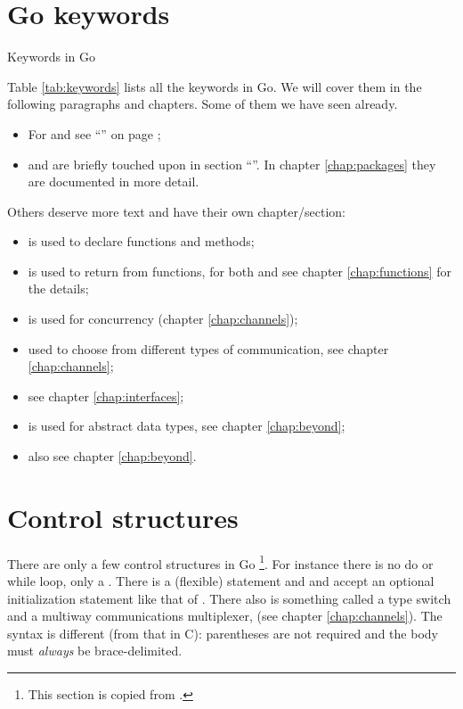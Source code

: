 \section{Go keywords}
\begin{table}[H]
\begin{center}
\caption{Keywords in Go}
\label{tab:keywords}

\end{center}
\end{table}
Table \ref{tab:keywords} lists all the keywords in Go. 
We will cover them in the following paragraphs and chapters. Some
of them we have seen already.
\begin{itemize}
\item For  and  see ``'' on
page \pageref{sec:vars};
\item {} and  are briefly touched upon in section ``''. 
In chapter \ref{chap:packages} they are documented in more detail.
\end{itemize}
Others deserve more text and have their own chapter/section:
\begin{itemize}
\item {} is used to declare functions and methods;
\item {} is used to return from functions, for both 
and  see chapter \ref{chap:functions} for the details;
\item {} is used for concurrency (chapter \ref{chap:channels});
\item {} used to choose from different types of communication, see chapter \ref{chap:channels};
\item {} see chapter \ref{chap:interfaces};
\item {} is used for abstract data types, see chapter \ref{chap:beyond};
\item {} also see chapter \ref{chap:beyond}.
\end{itemize}

\section{Control structures}
There are only a few control structures in 
Go \footnote{This section is copied from \cite{effective_go}.}.
For instance there is no do or while loop, only a 
. There is a (flexible)  statement and  and
 accept an
optional initialization statement like that of . There also is
something called a type switch and a multiway communications
multiplexer,  (see chapter \ref{chap:channels}). The syntax is 
different (from that in C): parentheses
are not required and the body must \emph{always} be brace-delimited.

